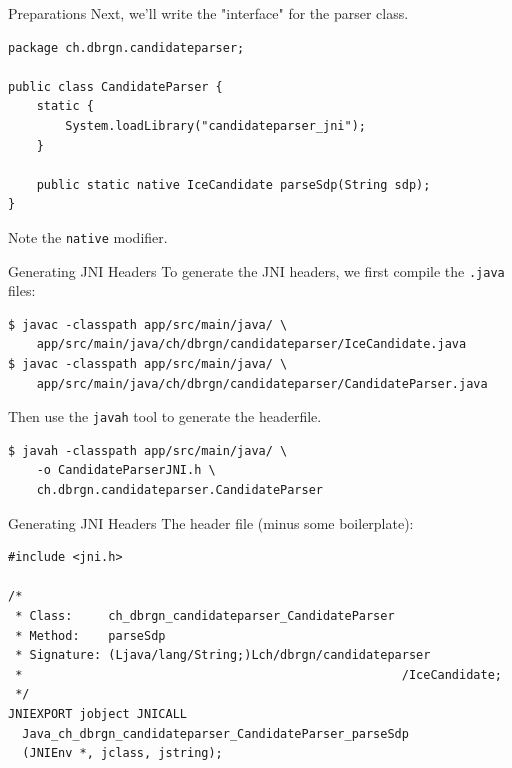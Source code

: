 \documentclass[aspectratio=1610,14pt,t]{beamer}
\begin{document}
\begin{frame}[c,fragile]{Preparations}
  Next, we'll write the "interface" for the parser class.

  \begin{verbatim}
package ch.dbrgn.candidateparser;

public class CandidateParser {
    static {
        System.loadLibrary("candidateparser_jni");
    }

    public static native IceCandidate parseSdp(String sdp);
}
  \end{verbatim}

Note the \texttt{native} modifier.
\end{frame}

\begin{frame}[c,fragile]{Generating JNI Headers}
  To generate the JNI headers, we first compile the \texttt{.java} files:

  \begin{verbatim}
$ javac -classpath app/src/main/java/ \
    app/src/main/java/ch/dbrgn/candidateparser/IceCandidate.java
$ javac -classpath app/src/main/java/ \
    app/src/main/java/ch/dbrgn/candidateparser/CandidateParser.java
  \end{verbatim}

  Then use the \texttt{javah} tool to generate the headerfile.

  \begin{verbatim}
$ javah -classpath app/src/main/java/ \
    -o CandidateParserJNI.h \
    ch.dbrgn.candidateparser.CandidateParser
  \end{verbatim}
\end{frame}

\begin{frame}[c,fragile]{Generating JNI Headers}
  The header file (minus some boilerplate):
  \begin{verbatim}
#include <jni.h>

/*
 * Class:     ch_dbrgn_candidateparser_CandidateParser
 * Method:    parseSdp
 * Signature: (Ljava/lang/String;)Lch/dbrgn/candidateparser
 *                                                     /IceCandidate;
 */
JNIEXPORT jobject JNICALL
  Java_ch_dbrgn_candidateparser_CandidateParser_parseSdp
  (JNIEnv *, jclass, jstring);
  \end{verbatim}

\end{frame}
\end{document}
